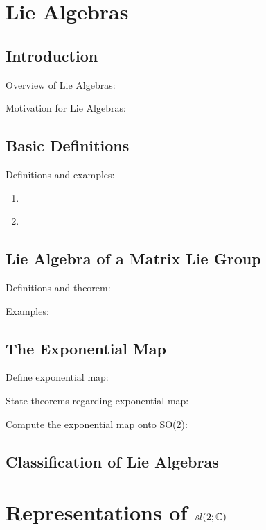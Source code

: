 \documentclass[11pt, a4paper, oneside]{article}
\theoremstyle{plain}
\theoremstyle{definition}
\theoremstyle{example}
\begin{document}
\newpage
\section{Lie Algebras}

\subsection{Introduction}

Overview of Lie Algebras: \cite{liealgebrawiki}

Motivation for Lie Algebras: \cite[Section 8.1]{fulton}

\subsection{Basic Definitions}

Definitions and examples:
\begin{enumerate}
\item \cite[Section 8.1]{fulton}

\item \cite[Section 3.1]{hall}
\end{enumerate}

\subsection{Lie Algebra of a Matrix Lie Group}

Definitions and theorem: \cite[Section 3.3]{hall}

Examples: \cite[Section 3.4]{hall}

\subsection{The Exponential Map}

Define exponential map: \cite[Section 3.7]{hall}

State theorems regarding exponential map: \cite[Section 3.7]{hall}

Compute the exponential map onto SO(2): \cite[Section 4.1]{stillwell}


\subsection{Classification of Lie Algebras}

\cite[Chapter 9]{fulton}

\newpage

\section{Representations of $sl(2; \mathbb{C})$}
\end{document}

